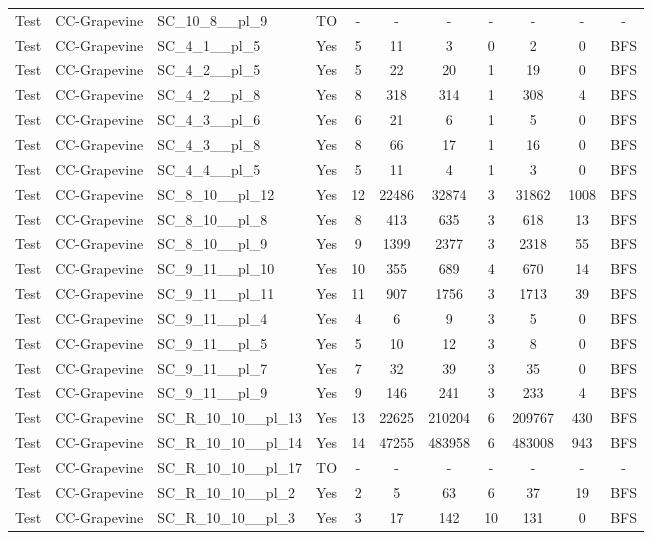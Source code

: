 \documentclass{article}
\begin{document}
\begin{tabular}{lllcccccccc}
Test & CC-Grapevine & SC\_10\_8\_\_pl\_9 & TO & - & - & - & - & - & - & - \\
Test & CC-Grapevine & SC\_4\_1\_\_pl\_5 & Yes & 5 & 11 & 3 & 0 & 2 & 0 & BFS \\
Test & CC-Grapevine & SC\_4\_2\_\_pl\_5 & Yes & 5 & 22 & 20 & 1 & 19 & 0 & BFS \\
Test & CC-Grapevine & SC\_4\_2\_\_pl\_8 & Yes & 8 & 318 & 314 & 1 & 308 & 4 & BFS \\
Test & CC-Grapevine & SC\_4\_3\_\_pl\_6 & Yes & 6 & 21 & 6 & 1 & 5 & 0 & BFS \\
Test & CC-Grapevine & SC\_4\_3\_\_pl\_8 & Yes & 8 & 66 & 17 & 1 & 16 & 0 & BFS \\
Test & CC-Grapevine & SC\_4\_4\_\_pl\_5 & Yes & 5 & 11 & 4 & 1 & 3 & 0 & BFS \\
Test & CC-Grapevine & SC\_8\_10\_\_pl\_12 & Yes & 12 & 22486 & 32874 & 3 & 31862 & 1008 & BFS \\
Test & CC-Grapevine & SC\_8\_10\_\_pl\_8 & Yes & 8 & 413 & 635 & 3 & 618 & 13 & BFS \\
Test & CC-Grapevine & SC\_8\_10\_\_pl\_9 & Yes & 9 & 1399 & 2377 & 3 & 2318 & 55 & BFS \\
Test & CC-Grapevine & SC\_9\_11\_\_pl\_10 & Yes & 10 & 355 & 689 & 4 & 670 & 14 & BFS \\
Test & CC-Grapevine & SC\_9\_11\_\_pl\_11 & Yes & 11 & 907 & 1756 & 3 & 1713 & 39 & BFS \\
Test & CC-Grapevine & SC\_9\_11\_\_pl\_4 & Yes & 4 & 6 & 9 & 3 & 5 & 0 & BFS \\
Test & CC-Grapevine & SC\_9\_11\_\_pl\_5 & Yes & 5 & 10 & 12 & 3 & 8 & 0 & BFS \\
Test & CC-Grapevine & SC\_9\_11\_\_pl\_7 & Yes & 7 & 32 & 39 & 3 & 35 & 0 & BFS \\
Test & CC-Grapevine & SC\_9\_11\_\_pl\_9 & Yes & 9 & 146 & 241 & 3 & 233 & 4 & BFS \\
Test & CC-Grapevine & SC\_R\_10\_10\_\_pl\_13 & Yes & 13 & 22625 & 210204 & 6 & 209767 & 430 & BFS \\
Test & CC-Grapevine & SC\_R\_10\_10\_\_pl\_14 & Yes & 14 & 47255 & 483958 & 6 & 483008 & 943 & BFS \\
Test & CC-Grapevine & SC\_R\_10\_10\_\_pl\_17 & TO & - & - & - & - & - & - & - \\
Test & CC-Grapevine & SC\_R\_10\_10\_\_pl\_2 & Yes & 2 & 5 & 63 & 6 & 37 & 19 & BFS \\
Test & CC-Grapevine & SC\_R\_10\_10\_\_pl\_3 & Yes & 3 & 17 & 142 & 10 & 131 & 0 & BFS \\

\end{tabular}
\end{document}
